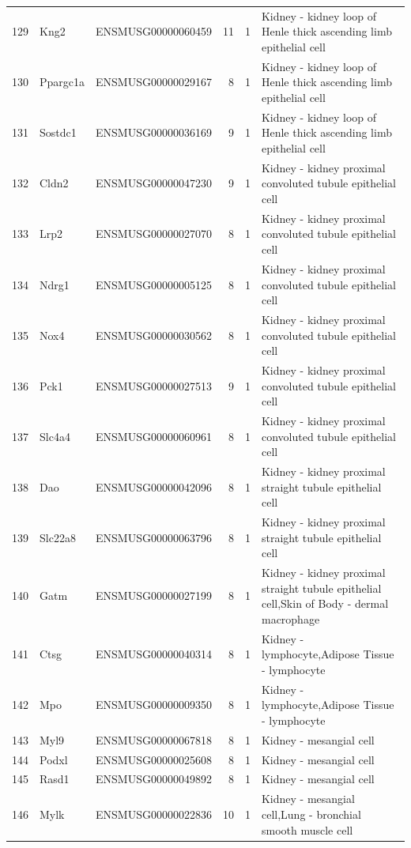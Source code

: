 \begin{table}[ht]
{\begin{tabular}{lllrrl}
        129 & Kng2 & ENSMUSG00000060459 & 11 & 1 & Kidney - kidney loop of Henle thick ascending limb epithelial cell \\
        130 & Ppargc1a & ENSMUSG00000029167 & 8 & 1 & Kidney - kidney loop of Henle thick ascending limb epithelial cell \\
        131 & Sostdc1 & ENSMUSG00000036169 & 9 & 1 & Kidney - kidney loop of Henle thick ascending limb epithelial cell \\
        132 & Cldn2 & ENSMUSG00000047230 & 9 & 1 & Kidney - kidney proximal convoluted tubule epithelial cell \\
        133 & Lrp2 & ENSMUSG00000027070 & 8 & 1 & Kidney - kidney proximal convoluted tubule epithelial cell \\
        134 & Ndrg1 & ENSMUSG00000005125 & 8 & 1 & Kidney - kidney proximal convoluted tubule epithelial cell \\
        135 & Nox4 & ENSMUSG00000030562 & 8 & 1 & Kidney - kidney proximal convoluted tubule epithelial cell \\
        136 & Pck1 & ENSMUSG00000027513 & 9 & 1 & Kidney - kidney proximal convoluted tubule epithelial cell \\
        137 & Slc4a4 & ENSMUSG00000060961 & 8 & 1 & Kidney - kidney proximal convoluted tubule epithelial cell \\
        138 & Dao & ENSMUSG00000042096 & 8 & 1 & Kidney - kidney proximal straight tubule epithelial cell \\
        139 & Slc22a8 & ENSMUSG00000063796 & 8 & 1 & Kidney - kidney proximal straight tubule epithelial cell \\
        140 & Gatm & ENSMUSG00000027199 & 8 & 1 & Kidney - kidney proximal straight tubule epithelial cell,Skin of Body - dermal macrophage \\
        141 & Ctsg & ENSMUSG00000040314 & 8 & 1 & Kidney - lymphocyte,Adipose Tissue - lymphocyte \\
        142 & Mpo & ENSMUSG00000009350 & 8 & 1 & Kidney - lymphocyte,Adipose Tissue - lymphocyte \\
        143 & Myl9 & ENSMUSG00000067818 & 8 & 1 & Kidney - mesangial cell \\
        144 & Podxl & ENSMUSG00000025608 & 8 & 1 & Kidney - mesangial cell \\
        145 & Rasd1 & ENSMUSG00000049892 & 8 & 1 & Kidney - mesangial cell \\
        146 & Mylk & ENSMUSG00000022836 & 10 & 1 & Kidney - mesangial cell,Lung - bronchial smooth muscle cell \\

\end{tabular}}
\end{table}
